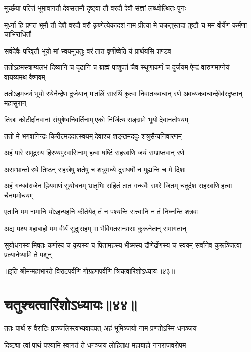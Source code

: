 \twolineshloka
{मूर्च्छया पतितं भूमावागतौ देवसत्तमौ}
{दृष्ट्वा तौ वरदौ देवौ संज्ञां लब्ध्वोत्थितः पुनः}


\threelineshloka
{मूर्ध्ना हि प्रणतं भूमौ तौ देवौ वरदौ वरौ}
{कृष्णेत्येकादशं नाम प्रीत्या मे चक्रतुस्तदा}
{तुष्टौ च मम वीर्येण कर्मणा चाभिराधितौ}


\twolineshloka
{सर्वदेवैः परिवृतौ भूयो मां स्वयमूचतुः}
{वरं तात वृणीष्वेति यं प्रार्थयसि पाण्डव}


\threelineshloka
{ततोऽहमस्त्राण्यलभं दिव्यानि च दृढानि च}
{ब्राह्मं पाशुपतं चैव स्थूणाकर्णं च दुर्जयम्}
{ऐन्द्रं वारुणमाग्नेयं वायव्यमथ वैष्णवम्}


\threelineshloka
{ततोऽहमजयं भूयो रथेनैन्द्रेण दुर्जयान्}
{मातलिं सारथिं कृत्वा निवातकवचान् रणे}
{अवध्यकवचान्देवैर्वरदृप्तान् महासुरान्}


\twolineshloka
{तिस्रः कोटीर्दानवानां संयुगेष्वनिवर्तिनाम्}
{एको निर्जित्य सङ्ग्रामे भूयो देवानतोषयम्}


\twolineshloka
{ततो मे भगवानिन्द्रः किरीटमददात्स्वयम्}
{देवाश्च शङ्खमददुः शत्रुसैन्यनिवारणम्}


\twolineshloka
{अहं पारे समुद्रस्य हिरण्यपुरवासिनाम्}
{हत्वा षष्टिं सहस्राणि जयं सम्प्राप्तवान् रणे}


\twolineshloka
{असम्भ्रान्तो रथे तिष्ठन् सहस्रेषु शतेषु च}
{शत्रुमध्ये दुराधर्षो न मुह्यन्ति च मे दिशः}


\threelineshloka
{अहं गन्धर्वराजेन ह्रियमाणं सुयोधनम्}
{भ्रातृभिः सहितं तात गन्धर्वैः समरे जितम्}
{चतुर्दश सहस्राणि हत्वा चैनममोचयम्}


\twolineshloka
{एतानि मम नामानि योऽहन्यहनि कीर्तयेत्}
{तं न पश्यन्ति सत्त्वानि न तं निघ्नन्ति शत्रवः}


\twolineshloka
{अद्य पश्य महाबाहो मम वीर्यं सुदुःसहम्}
{मा भैर्विगतसन्त्रासः कुरूनेतान् समागतान्}


\threelineshloka
{सुयोधनस्य मिषतः कर्णस्य च कृपस्य च}
{पितामहस्य भीष्मस्य द्रौणेर्द्रोणस्य च स्वयम्}
{सर्वानेव कुरूञ्जित्वा प्रत्यानेष्यामि ते पशून्}

॥इति श्रीमन्महाभारते विराटपर्वणि गोग्रहणपर्वणि त्रिचत्वारिंशोऽध्यायः॥४३॥

\chapter{चतुश्चत्वारिंशोऽध्यायः॥४४॥}

\twolineshloka
{ततः पार्थं स वैराटिः प्राञ्जलिस्त्वभ्यवादयत्}
{अहं भूमिञ्जयो नाम प्रणतोऽस्मि धनञ्जय}


\twolineshloka
{दिष्ट्या त्वां पार्थ पश्यामि स्वागतं ते धनञ्जय}
{लोहिताक्ष महाबाहो नागराजवरोपम}


